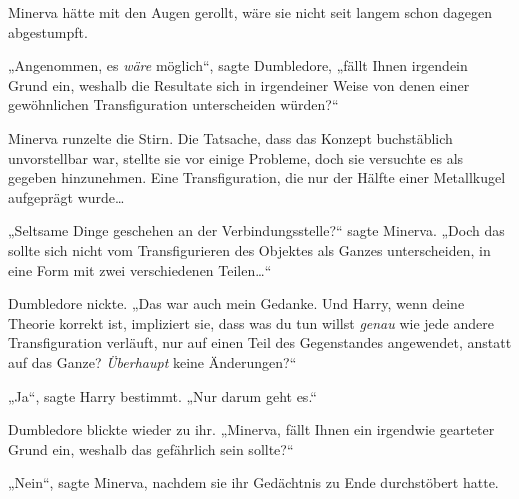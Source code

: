 Minerva hätte mit den Augen gerollt, wäre sie nicht seit langem schon dagegen abgestumpft.

„Angenommen, es \emph{wäre} möglich“, sagte Dumbledore, „fällt Ihnen irgendein Grund ein, weshalb die Resultate sich in irgendeiner Weise von denen einer gewöhnlichen Transfiguration unterscheiden würden?“

Minerva runzelte die Stirn. Die Tatsache, dass das Konzept buchstäblich unvorstellbar war, stellte sie vor einige Probleme, doch sie versuchte es als gegeben hinzunehmen. Eine Transfiguration, die nur der Hälfte einer Metallkugel aufgeprägt wurde…

„Seltsame Dinge geschehen an der Verbindungsstelle?“ sagte Minerva. „Doch das sollte sich nicht vom Transfigurieren des Objektes als Ganzes unterscheiden, in eine Form mit zwei verschiedenen Teilen…“

Dumbledore nickte. „Das war auch mein Gedanke. Und Harry, wenn deine Theorie korrekt ist, impliziert sie, dass was du tun willst \emph{genau} wie jede andere Transfiguration verläuft, nur auf einen Teil des Gegenstandes angewendet, anstatt auf das Ganze? \emph{Überhaupt} keine Änderungen?“

„Ja“, sagte Harry bestimmt. „Nur darum geht es.“

Dumbledore blickte wieder zu ihr. „Minerva, fällt Ihnen ein irgendwie gearteter Grund ein, weshalb das gefährlich sein sollte?“

„Nein“, sagte Minerva, nachdem sie ihr Gedächtnis zu Ende durchstöbert hatte.

